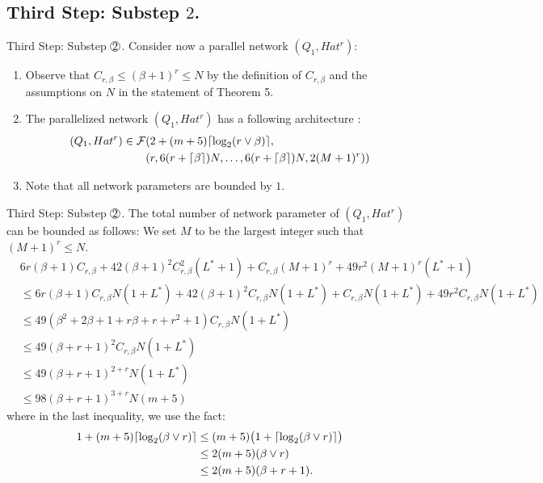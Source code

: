 \documentclass{if-beamer}
\DeclarePairedDelimiter{\ceil}{\lceil}{\rceil}
\newcommand*\circled[1]{\tikz[baseline=(char.base)]{
            \node[shape=circle,draw,inner sep=0.2pt] (char) {#1};}}
\begin{document}
\subsection{Third Step: Substep $2$.}
\begin{frame}{Third Step: Substep $\circled{2}$.}
Consider now a parallel network $(Q_{1},Hat^{r})$:
\begin{enumerate}
    \item Observe that $C_{r,\beta} \leq (\beta+1)^{r} \leq N$ by the definition of $C_{r,\beta}$ and the assumptions on $N$ in the statement of Theorem 5. 
    \item The parallelized network $(Q_{1},Hat^{r})$ has a following architecture :
    \begin{align*}
        (Q_{1},Hat^{r}) \in \mathcal{F}&(2+(m+5) \ceil{\log_{2}(r \vee \beta)},\\
            &(r,6(r+\ceil{\beta})N,\dots,6(r+\ceil{\beta})N,2(M+1)^{r}))
    \end{align*}
    \item Note that all network parameters are bounded by $1$.
\end{enumerate}

\end{frame}

\begin{frame}{Third Step: Substep $\circled{2}$.}
The total number of network parameter of $(Q_{1}, Hat^{r})$ can be bounded as follows:
We set $M$ to be the largest integer such that $(M+1)^{r} \leq N$.
    \begin{align*}
        &6r(\beta+1)C_{r,\beta} +42(\beta+1)^{2}C_{r,\beta}^{2}(L^*+1) + C_{r,\beta}(M+1)^{r} + 49r^{2}(M+1)^{r}(L^*+1) \\
        &\leq 6r(\beta+1)C_{r,\beta}N(1+L^*) + 42(\beta+1)^{2}C_{r,\beta}N(1+L^*)  + C_{r,\beta}N(1+L^*) + 49r^{2}C_{r,\beta}N(1+L^*)\\
        &\leq 49(\beta^{2}+2\beta+1+r\beta+r+r^{2}+1)C_{r,\beta}N(1+L^*)\\
        &\leq 49(\beta+r+1)^{2}C_{r,\beta}N(1+L^*)\\
        &\leq 49(\beta+r+1)^{2+r}N(1+L^*)\\
        &\leq 98(\beta+r+1)^{3+r}N(m+5)
    \end{align*}
where in the last inequality, we use the fact:
\begin{align*}
    1+(m+5)\ceil{\log_{2}(\beta \vee r)} 
    &\leq (m+5) \big( 1+\ceil{\log_{2}(\beta \vee r)}\big)\\
    &\leq 2(m+5)(\beta \vee r)\\
    &\leq 2(m+5)(\beta + r + 1).
\end{align*}
\end{frame}
\end{document}
